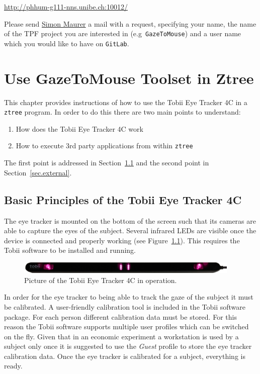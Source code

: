\documentclass[a4paper,oneside]{book}
\begin{document}
\url{http://phhum-g111-nns.unibe.ch:10012/}

Please send \href{simon.maurer@humdek.unibe.ch}{Simon Maurer} a mail with a request, specifying your name, the name of the TPF project you are interested in (e.g~\texttt{GazeToMouse}) and a user name which you would like to have on \texttt{GitLab}.


\chapter{Use GazeToMouse Toolset in Ztree}
\label{sec.gazetomouse}
This chapter provides instructions of how to use the Tobii Eye Tracker 4C in a \texttt{ztree} program.
In order to do this there are two main points to understand:
\begin{enumerate}
    \item How does the Tobii Eye Tracker 4C work
    \item How to execute 3rd party applications from within \texttt{ztree}
\end{enumerate}
The first point is addressed in Section~\ref{sec.eyetracker} and the second point in Section~\ref{sec.external}.

\section{Basic Principles of the Tobii Eye Tracker 4C}
\label{sec.eyetracker}
The eye tracker is mounted on the bottom of the screen such that its cameras are able to capture the eyes of the subject.
Several infrared LEDs are visible once the device is connected and properly working (see Figure~\ref{fig.eyetracker}).
This requires the Tobii software to be installed and running.
\begin{figure}[ht]
    \centering
    \includegraphics[width=0.95\textwidth]{eye_tracker.jpg}
    \caption{Picture of the Tobii Eye Tracker 4C in operation.}
    \label{fig.eyetracker}
\end{figure}

In order for the eye tracker to being able to track the gaze of the subject it must be calibrated.
A user-friendly calibration tool is included in the Tobii software package.
For each person different calibration data must be stored.
For this reason the Tobii software supports multiple user profiles which can be switched on the fly.
Given that in an economic experiment a workstation is used by a subject only once it is suggested to use the \emph{Guest} profile to store the eye tracker calibration data.
Once the eye tracker is calibrated for a subject, everything is ready.
\end{document}
